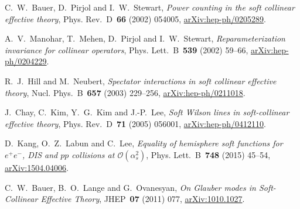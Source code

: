 
C.~W.~Bauer, D.~Pirjol and I.~W.~Stewart, \emph{Power counting in the soft collinear effective theory}, Phys. Rev.~D~\textbf{66} (2002) \mbox{054005}, \href{https://arxiv.org/abs/hep-ph/0205289}{arXiv:hep-ph/0205289}.

A.~V.~Manohar, T.~Mehen, D.~Pirjol and I.~W.~Stewart, \emph{Reparameterization invariance for collinear operators}, Phys. Lett.~B~\textbf{539} (2002) \mbox{59--66}, \href{https://arxiv.org/abs/hep-ph/0204229}{arXiv:hep-ph/0204229}.

R.~J.~Hill and M.~Neubert, \emph{Spectator interactions in soft collinear effective theory}, Nucl. Phys.~B~\textbf{657} (2003) \mbox{229--256}, \href{https://arxiv.org/abs/hep-ph/0211018}{arXiv:hep-ph/0211018}.

J.~Chay, C.~Kim, Y.~G.~Kim and J.-P.~Lee, \emph{Soft Wilson lines in soft-collinear effective theory}, Phys. Rev.~D~\textbf{71} (2005) \mbox{056001}, \href{https://arxiv.org/abs/hep-ph/0412110}{arXiv:hep-ph/0412110}.

D.~Kang, O.~Z.~Labun and C.~Lee, \emph{Equality of hemisphere soft functions for $e^+e^-$, DIS and $pp$ collisions at $\mathcal{O}(\alpha_s^2)$}, Phys. Lett.~B~\textbf{748} (2015) \mbox{45--54}, \href{https://arxiv.org/abs/1504.04006}{arXiv:1504.04006}.

C.~W.~Bauer, B.~O.~Lange and G.~Ovanesyan, \emph{On Glauber modes in Soft-Collinear Effective Theory}, JHEP~\textbf{07} (2011) \mbox{077}, \href{https://arxiv.org/abs/1010.1027}{arXiv:1010.1027}.

